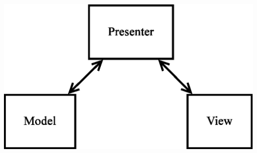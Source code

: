 \documentclass[russian,utf8,a1paper,nostitching,simple]{eskdgraph}
\begin{document}
\begin{ESKDdrawing}
  \begin{minipage}{42cm}
    \centering
     \\
    \vspace{2cm}
    \centering
    \includegraphics[height=15cm]{fig/design_mvp.eps}


\end{minipage}
\end{ESKDdrawing}
\end{document}
